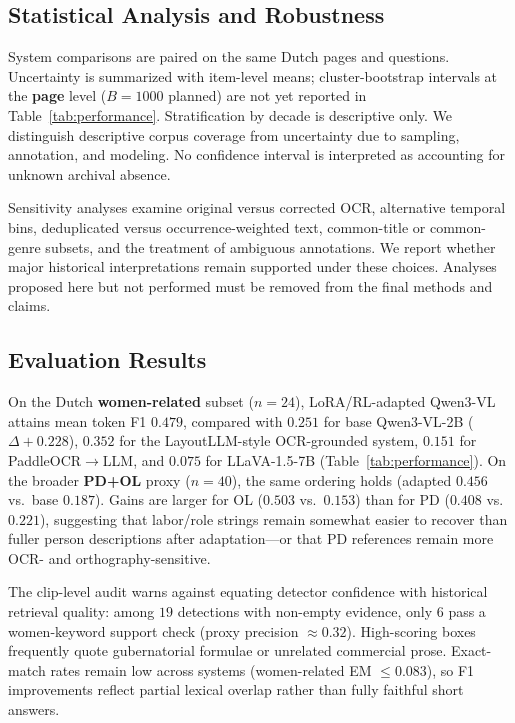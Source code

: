 \documentclass[sigconf]{acmart}
\begin{document}
\subsection{Statistical Analysis and Robustness}

System comparisons are paired on the same Dutch pages and questions. Uncertainty is summarized with item-level means; cluster-bootstrap intervals at the \textbf{page} level ($B{=}1000$ planned) are not yet reported in Table~\ref{tab:performance}. Stratification by decade is descriptive only. We distinguish descriptive corpus coverage from uncertainty due to sampling, annotation, and modeling. No confidence interval is interpreted as accounting for unknown archival absence.

Sensitivity analyses examine original versus corrected OCR, alternative temporal bins, deduplicated versus occurrence-weighted text, common-title or common-genre subsets, and the treatment of ambiguous annotations. We report whether major historical interpretations remain supported under these choices. Analyses proposed here but not performed must be removed from the final methods and claims.

\subsection{Evaluation Results}

On the Dutch \textbf{women-related} subset ($n{=}24$), LoRA/RL-adapted Qwen3-VL attains mean token F1 $0.479$, compared with $0.251$ for base Qwen3-VL-2B ($\Delta{+}0.228$), $0.352$ for the LayoutLLM-style OCR-grounded system, $0.151$ for PaddleOCR$\rightarrow$LLM, and $0.075$ for LLaVA-1.5-7B (Table~\ref{tab:performance}). On the broader \textbf{PD+OL} proxy ($n{=}40$), the same ordering holds (adapted $0.456$ vs.\ base $0.187$). Gains are larger for OL ($0.503$ vs.\ $0.153$) than for PD ($0.408$ vs.\ $0.221$), suggesting that labor/role strings remain somewhat easier to recover than fuller person descriptions after adaptation---or that PD references remain more OCR- and orthography-sensitive.

The clip-level audit warns against equating detector confidence with historical retrieval quality: among $19$ detections with non-empty evidence, only $6$ pass a women-keyword support check (proxy precision $\approx 0.32$). High-scoring boxes frequently quote gubernatorial formulae or unrelated commercial prose. Exact-match rates remain low across systems (women-related EM $\le 0.083$), so F1 improvements reflect partial lexical overlap rather than fully faithful short answers.
\end{document}
